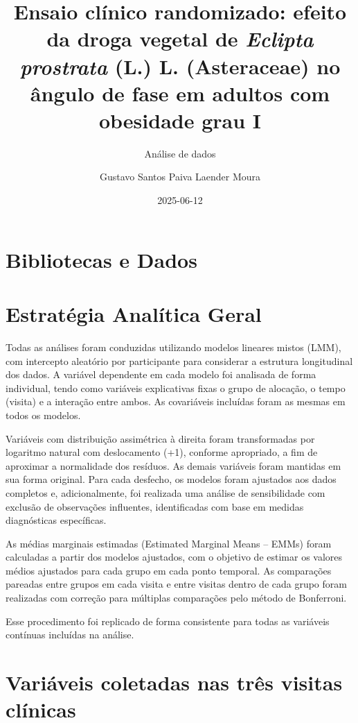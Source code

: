 \documentclass[
  12pt,
]{article}
\title{Ensaio clínico randomizado: efeito da droga vegetal de
\emph{Eclipta prostrata} (L.) L. (Asteraceae) no ângulo de fase em
adultos com obesidade grau I}
\subtitle{Análise de dados}
\author{Gustavo Santos Paiva Laender Moura}
\date{2025-06-12}
\renewcommand*\contentsname{Índice}
\newcommand\contentsname{Índice}
\begin{document}
\maketitle

\renewcommand*\contentsname{Índice}
{
\hypersetup{linkcolor=}
\setcounter{tocdepth}{4}
\tableofcontents
}

\section{Bibliotecas e Dados}\label{bibliotecas-e-dados}

\newpage{}

\section{Estratégia Analítica
Geral}\label{estratuxe9gia-analuxedtica-geral}

Todas as análises foram conduzidas utilizando modelos lineares mistos
(LMM), com intercepto aleatório por participante para considerar a
estrutura longitudinal dos dados. A variável dependente em cada modelo
foi analisada de forma individual, tendo como variáveis explicativas
fixas o grupo de alocação, o tempo (visita) e a interação entre ambos.
As covariáveis incluídas foram as mesmas em todos os modelos.

Variáveis com distribuição assimétrica à direita foram transformadas por
logaritmo natural com deslocamento (+1), conforme apropriado, a fim de
aproximar a normalidade dos resíduos. As demais variáveis foram mantidas
em sua forma original. Para cada desfecho, os modelos foram ajustados
aos dados completos e, adicionalmente, foi realizada uma análise de
sensibilidade com exclusão de observações influentes, identificadas com
base em medidas diagnósticas específicas.

As médias marginais estimadas (Estimated Marginal Means -- EMMs) foram
calculadas a partir dos modelos ajustados, com o objetivo de estimar os
valores médios ajustados para cada grupo em cada ponto temporal. As
comparações pareadas entre grupos em cada visita e entre visitas dentro
de cada grupo foram realizadas com correção para múltiplas comparações
pelo método de Bonferroni.

Esse procedimento foi replicado de forma consistente para todas as
variáveis contínuas incluídas na análise.

\section{Variáveis coletadas nas três visitas
clínicas}\label{variuxe1veis-coletadas-nas-truxeas-visitas-cluxednicas}
\end{document}
